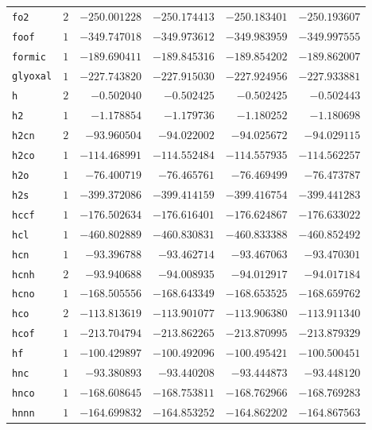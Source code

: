 {\begin{longtable}{@{}lrrrrr@{}}
    \texttt{fo2} & $2$ & $-250.001228$ & $-250.174413$ & $-250.183401$ & $-250.193607$ \\
    \texttt{foof} & $1$ & $-349.747018$ & $-349.973612$ & $-349.983959$ & $-349.997555$ \\
    \texttt{formic} & $1$ & $-189.690411$ & $-189.845316$ & $-189.854202$ & $-189.862007$ \\
    \texttt{glyoxal} & $1$ & $-227.743820$ & $-227.915030$ & $-227.924956$ & $-227.933881$ \\
    \texttt{h} & $2$ & $-0.502040$ & $-0.502425$ & $-0.502425$ & $-0.502443$ \\
    \texttt{h2} & $1$ & $-1.178854$ & $-1.179736$ & $-1.180252$ & $-1.180698$ \\
    \texttt{h2cn} & $2$ & $-93.960504$ & $-94.022002$ & $-94.025672$ & $-94.029115$ \\
    \texttt{h2co} & $1$ & $-114.468991$ & $-114.552484$ & $-114.557935$ & $-114.562257$ \\
    \texttt{h2o} & $1$ & $-76.400719$ & $-76.465761$ & $-76.469499$ & $-76.473787$ \\
    \texttt{h2s} & $1$ & $-399.372086$ & $-399.414159$ & $-399.416754$ & $-399.441283$ \\
    \texttt{hccf} & $1$ & $-176.502634$ & $-176.616401$ & $-176.624867$ & $-176.633022$ \\
    \texttt{hcl} & $1$ & $-460.802889$ & $-460.830831$ & $-460.833388$ & $-460.852492$ \\
    \texttt{hcn} & $1$ & $-93.396788$ & $-93.462714$ & $-93.467063$ & $-93.470301$ \\
    \texttt{hcnh} & $2$ & $-93.940688$ & $-94.008935$ & $-94.012917$ & $-94.017184$ \\
    \texttt{hcno} & $1$ & $-168.505556$ & $-168.643349$ & $-168.653525$ & $-168.659762$ \\
    \texttt{hco} & $2$ & $-113.813619$ & $-113.901077$ & $-113.906380$ & $-113.911340$ \\
    \texttt{hcof} & $1$ & $-213.704794$ & $-213.862265$ & $-213.870995$ & $-213.879329$ \\
    \texttt{hf} & $1$ & $-100.429897$ & $-100.492096$ & $-100.495421$ & $-100.500451$ \\
    \texttt{hnc} & $1$ & $-93.380893$ & $-93.440208$ & $-93.444873$ & $-93.448120$ \\
    \texttt{hnco} & $1$ & $-168.608645$ & $-168.753811$ & $-168.762966$ & $-168.769283$ \\
    \texttt{hnnn} & $1$ & $-164.699832$ & $-164.853252$ & $-164.862202$ & $-164.867563$ \\

\end{longtable}}
